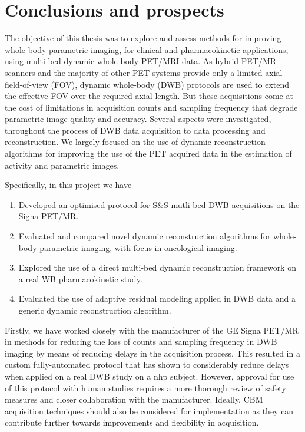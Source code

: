 \chapter*{Conclusions and prospects}
The objective of this thesis was to explore and assess methods for improving whole-body parametric imaging, for clinical and pharmacokinetic applications, using multi-bed dynamic whole body PET/MRI data.
As hybrid PET/MR scanners and the majority of other PET systems provide only a limited axial field-of-view (FOV), dynamic whole-body (DWB) protocols are used to extend the effective FOV over the required axial length. But these acquisitions come at the cost of limitations in acquisition counts and sampling frequency that degrade parametric image quality and accuracy.
Several aspects were investigated, throughout the process of DWB data acquisition to data processing and reconstruction. We largely focused on the use of dynamic reconstruction algorithms for improving the use of the PET acquired data in the estimation of activity and parametric images.

Specifically, in this project we have
\begin{enumerate}
\item Developed an optimised protocol for S\&S mutli-bed DWB acquisitions on the Signa PET/MR.
\item Evaluated and compared novel dynamic reconstruction algorithms for whole-body parametric imaging, with focus in oncological imaging.
\item Explored the use of a direct multi-bed dynamic reconstruction framework on a real WB pharmacokinetic study.
\item Evaluated the use of adaptive residual modeling applied in DWB data and a generic dynamic reconstruction algorithm.
\end{enumerate}

Firstly, we have worked closely with the manufacturer of the GE Signa PET/MR in methods for reducing the loss of counts and sampling frequency in DWB imaging by means of reducing delays in the acquisition process. This resulted in a custom fully-automated protocol that has shown to considerably reduce delays when applied on a real DWB study on a \gls{nhp} subject. However, approval for use of this protocol with human studies requires a more thorough review of safety measures and closer collaboration with the manufacturer. Ideally, CBM acquisition techniques should also be considered for implementation as they can contribute further towards improvements and flexibility in acquisition. 

